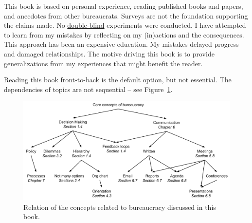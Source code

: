 This book is based on personal experience, reading published books and papers, and anecdotes from other bureaucrats. Surveys are not the foundation supporting the claims made. No \href{https://en.wikipedia.org/wiki/Blinded_experiment}{double-blind} 
experiments were conducted. 
I have attempted to learn from my mistakes by reflecting on my (in)actions and the consequences. This approach has been an expensive education. My mistakes delayed progress and damaged relationships. The motive driving this book is to provide generalizations from my experiences that might benefit the reader.


Reading this book front-to-back is the default option, but not essential. The dependencies of topics are not sequential -- see Figure~\ref{fig:core-concepts}.

\begin{figure}[ht]
    \centering
    \includegraphics[width=1\textwidth]{images/core_concepts_map.pdf}
    \caption{Relation of the concepts related to bureaucracy discussed in this book. }
    \label{fig:core-concepts}
\end{figure}


